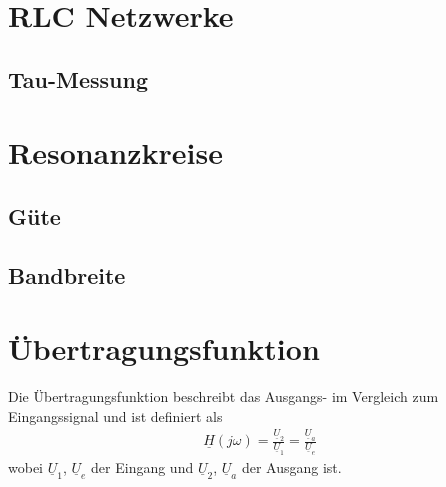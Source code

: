 \section{RLC Netzwerke}

\subsection{Tau-Messung}



\section{Resonanzkreise}

\subsection{Güte}

\subsection{Bandbreite}
\section{Übertragungsfunktion}
Die Übertragungsfunktion beschreibt das Ausgangs- im Vergleich zum
Eingangssignal und ist definiert als
\begin{align}
    \underline{H}(j\omega)=\frac{\underline{U}_2}{\underline{U}_1}=\frac{\underline{U}_a}{\underline{U}_e}
\end{align}
wobei $\underline{U}_1$, $\underline{U}_e$ der Eingang und $\underline{U}_2$, $\underline{U}_a$ der Ausgang ist.


